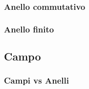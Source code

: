 \textsf{\small }

\subsubsection{Anello commutativo}

\textsf{\small }

\subsubsection{Anello finito} %

\textsf{\small }

\subsection{Campo} %


\textsf{\small }

\subsubsection{Campi vs Anelli} %

\textsf{\small }

